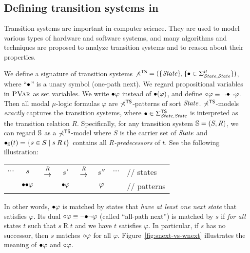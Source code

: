 \documentclass{almostllncs}
\begin{document}
\subsection{Defining transition systems in \MmuL}

Transition systems are important in computer science. They are used to model various
types of hardware and software systems, and many algorithms and techniques are proposed
to analyze transition systems and to reason about their properties.

We define a signature of transition systems $\mathbb{\Sigma}^{\textnormal{\textsf{TS}}} = ( \{ \textit{State} \} , \{ {\bullet} \in \Sigma^\mu_{\textit{State},\textit{State}} \} )$, where ``${\bullet}$'' is a unary symbol (one-path next).
We regard propositional variables in ${\normalfont\textsc{PVar}}$ as \mmul set variables.
We write ${\bullet} \varphi$ instead of ${\bullet} (\varphi)$,
and define ${\circ} \varphi \equiv \neg {\bullet} \neg \varphi$.
Then all modal $\mu$-logic formulas $\varphi$ are \mmul $\mathbb{\Sigma}^{\textnormal{\textsf{TS}}}$-patterns of sort $\textit{State}$.
$\mathbb{\Sigma}^{\textnormal{\textsf{TS}}}$-models {\em exactly} captures the transition systems, where
${\bullet} \in \Sigma^{\textnormal{\textsf{TS}}}_{\textit{State},\textit{State}}$ is interpreted as the transition relation $R$.
Specifically, for any transition system
$\mathbb{S} = (S,R)$, we can regard $\mathbb{S}$ as a $\mathbb{\Sigma}^{\textnormal{\textsf{TS}}}$-model
where $S$ is the carrier set of $\textit{State}$ and
${\bullet}_{\mathbb{S}}(t) = \{ s \in S \mid s \mathbin{R} t \}$ contains all \emph{$R$-predecessors} of $t$. See the following illustration:

\begin{tabular}{cccccccl}
$\cdots$ & $s$ & $\xrightarrow{R}$ & $s'$  & $\xrightarrow{R}$ & $s''$ & 
$\cdots$ & // states \\
& ${\bullet} {\bullet} \varphi$ && ${\bullet} \varphi$ && $\varphi$
&& // patterns
\end{tabular}

\noindent
In other words, ${\bullet} \varphi$ is matched by states that \emph{have at least one next state} that satisfies $\varphi$.
Its dual ${\circ} \varphi \equiv \neg {\bullet} \neg \varphi$ (called ``all-path next'') is matched by $s$ if \emph{for all} states $t$ such that $s \mathbin{R} t$ and
we have $t$ satisfies $\varphi$.
In particular, if $s$ has no successor, then $s$ matches ${\circ} \varphi$ for all $\varphi$.
Figure~\ref{fig:snext-vs-wnext} illustrates the meaning of ${\bullet} \varphi$ and ${\circ} \varphi$.
\end{document}
